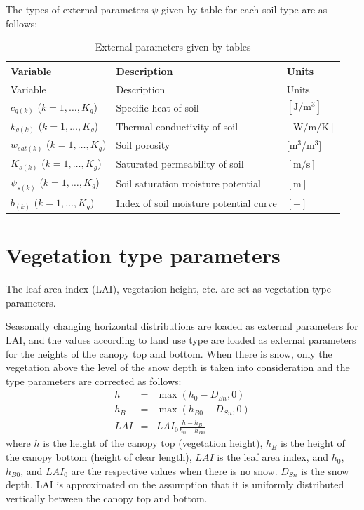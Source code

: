 The types of external parameters \(\psi\) given by table for each soil type are as follows:

\begin{longtable}[]{@{}lll@{}}
\caption{External parameters given by tables}\tabularnewline
\toprule
Variable & Description & Units \\
\midrule
\endfirsthead
\toprule
Variable & Description & Units \\
\midrule
\endhead
\(c_{g(k)}\) (\(k=1,\ldots,K_g\)) & Specific heat of soil & \(\mathrm{[J/m^3]}\) \\
\(k_{g(k)}\) (\(k=1,\ldots,K_g\)) & Thermal conductivity of soil & \(\mathrm{[W/m/K]}\) \\
\(w_{sat(k)}\) (\(k=1,\ldots,K_g\)) & Soil porosity & {[}m\(^3\)/m\(^3\){]} \\
\(K_{s(k)}\) (\(k=1,\ldots,K_g\)) & Saturated permeability of soil & \(\mathrm{[m/s]}\) \\
\(\psi_{s(k)}\) (\(k=1,\ldots,K_g\)) & Soil saturation moisture potential & \(\mathrm{[m]}\) \\
\(b_{(k)}\) (\(k=1,\ldots,K_g\)) & Index of soil moisture potential curve & \(\mathrm{[-]}\) \\
\bottomrule
\end{longtable}

\hypertarget{vegetation-type-parameters}{%
\section{Vegetation type parameters}\label{vegetation-type-parameters}}

The leaf area index (LAI), vegetation height, etc. are set as vegetation type parameters.

Seasonally changing horizontal distributions are loaded as external parameters for LAI, and the values according to land use type are loaded as external parameters for the heights of the canopy top
and bottom. When there is snow, only the vegetation above the level of the snow depth is taken into consideration and the type parameters are corrected as follows: \begin{eqnarray}
 h   &=& \max( h_0 - D_{Sn}, 0 ) \\
 h_B &=& \max( h_{B0} - D_{Sn}, 0 ) \\
 LAI &=& LAI_0 \frac{h-h_B}{h_0-h_{B0}}
\end{eqnarray} where \(h\) is the height of the canopy top (vegetation height), \(h_B\) is the height of the canopy bottom (height of clear length), \(LAI\) is the leaf area index, and \(h_0\), \(h_{B0}\), and
\(LAI_0\) are the respective values when there is no snow. \(D_{Sn}\) is the snow depth. LAI is approximated on the assumption that it is uniformly distributed vertically between the canopy top and
bottom.

